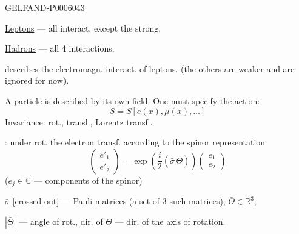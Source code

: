 \begin{GelfandAdjacentEvidence}{GELFAND-P000604}{3}


\underline{Leptons} — all interact. except the strong.

\underline{Hadrons} — all 4 interactions.

 describes the electromagn. interact. of leptons. (the others are weaker and are ignored for now).

A particle is described by its own field. One must specify the action:
\[
S=S[e(x),\mu(x),\ldots]
\]
Invariance: rot., transl., Lorentz transf..

: under rot. the electron transf. according to the spinor representation
\[
\begin{pmatrix}e'_1\\e'_2\end{pmatrix}
=\exp\left(\frac i2(\bar\sigma\,\bar\Theta)\right)
\begin{pmatrix}e_1\\e_2\end{pmatrix}
\]
\hfill(\(e_j\in\mathbb C\) — components of the spinor)\par

\(\bar\sigma\) [crossed out] — Pauli matrices (a set of 3 such matrices); \(\bar\Theta\in\mathbb R^3\);
\end{GelfandAdjacentEvidence}


\(|\bar\Theta|\) — angle of rot., dir. of \(\Theta\) — dir. of the axis of rotation.


